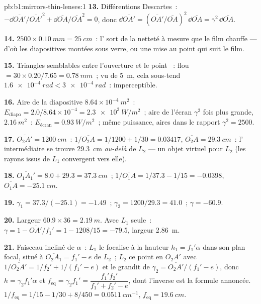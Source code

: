 \begin{solution}{pb:b1:mirrors-thin-lenses:1}
\textbf{13.} Différentions Descartes~: $-\dd\overline{OA'}/\overline{OA'}^2
+ \dd\overline{OA}/\overline{OA}^2 = 0$, donc $\dd\overline{OA'} =
(\overline{OA'}/\overline{OA})^2\,\dd\overline{OA} = \gamma^2\,\dd\overline{OA}$.

\textbf{14.} $2500 \times \qty{0.10}{mm} = \qty{25}{cm}$~: l' sort
de la netteté à mesure que le film chauffe --- d'où les diapositives
montées sous verre, ou une mise au point qui suit le film.

\textbf{15.} Triangles semblables entre l'ouverture et le point ~:
flou $= 30 \times 0.20/7.65 = \qty{0.78}{mm}$~; vu de \qty{5}{m}, cela
sous-tend $\qty{1.6e-4}{rad} < \qty{3e-4}{rad}$~: imperceptible.

\textbf{16.} Aire de la diapositive $8.64\times10^{-4}\ \unit{m^2}$~: $E_{\text{diapo}}
= 2.0/8.64\times10^{-4} = \qty{2.3e3}{W/m^2}$~; aire de l'écran $\gamma^2$
fois plus grande, $\qty{2.16}{m^2}$~: $E_{\text{écran}} = \qty{0.93}{W/m^2}$~;
même puissance, aires dans le rapport $\gamma^2 = 2500$.

\textbf{17.} $\overline{O_2A'} = \qty{1200}{cm}$~: $1/\overline{O_2A} =
1/1200 + 1/30 = 0.03417$, $\overline{O_2A} = \qty{+29.3}{cm}$~: l'
intermédiaire se trouve \qty{29.3}{cm} \emph{au-delà} de $L_2$ --- un
objet virtuel pour $L_2$ (les rayons issus de $L_1$ convergent vers elle).

\textbf{18.} $\overline{O_1A_1'} = 8.0 + 29.3 = \qty{37.3}{cm}$~;
$1/\overline{O_1A} = 1/37.3 - 1/15 = -0.0398$, $\overline{O_1A} =
\qty{-25.1}{cm}$.

\textbf{19.} $\gamma_1 = 37.3/(-25.1) = -1.49$~; $\gamma_2 = 1200/29.3 =
41.0$~; $\gamma = -60.9$.

\textbf{20.} Largeur $60.9 \times 36 = \qty{2.19}{m}$. Avec $L_1$ seule~:
$\gamma = 1 - \overline{OA'}/f_1' = 1 - 1208/15 = -79.5$, largeur
\qty{2.86}{m}.

\textbf{21.} Faisceau incliné de $\alpha$~: $L_1$ le focalise à la hauteur $h_1 = f_1'\alpha$
dans son plan focal, situé à $\overline{O_2A_1} = f_1' - e$ de $L_2$~;
$L_2$  ce point en $\overline{O_2A'}$ avec $1/\overline{O_2A'}
= 1/f_2' + 1/(f_1' - e)$ et le grandit de $\gamma_2 = \overline{O_2A'}/(f_1'
- e)$, donc $h = \gamma_2 f_1'\alpha$ et $f_{\mathrm{eq}} = \gamma_2 f_1'
= \dfrac{f_1' f_2'}{f_1' + f_2' - e}$, dont l'inverse est la formule
annoncée. $1/f_{\mathrm{eq}} = 1/15 - 1/30 + 8/450 = \qty{0.0511}{cm^{-1}}$,
$f_{\mathrm{eq}} = \qty{19.6}{cm}$.


\end{solution}
